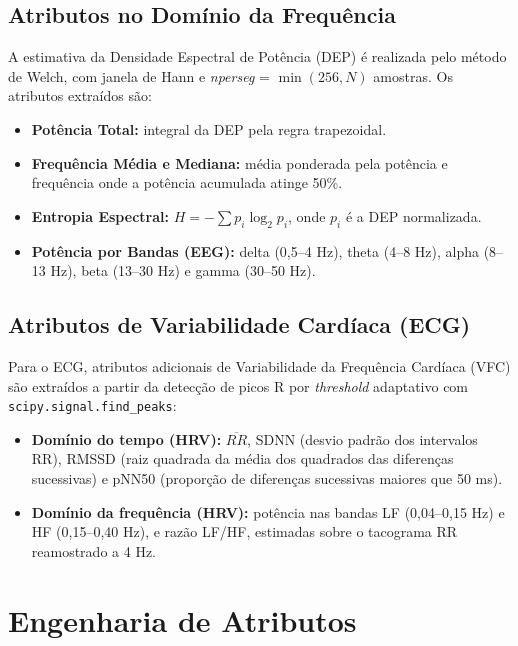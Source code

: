 \subsection{Atributos no Domínio da Frequência}

A estimativa da Densidade Espectral de Potência (DEP) é realizada pelo método de Welch, com janela de Hann e \textit{nperseg} = $\min(256, N)$ amostras. Os atributos extraídos são:

\begin{itemize}
    \item \textbf{Potência Total:} integral da DEP pela regra trapezoidal.
    \item \textbf{Frequência Média e Mediana:} média ponderada pela potência e frequência onde a potência acumulada atinge 50\%.
    \item \textbf{Entropia Espectral:} $H = -\sum p_i \log_2 p_i$, onde $p_i$ é a DEP normalizada.
    \item \textbf{Potência por Bandas (EEG):} delta (0,5--4 Hz), theta (4--8 Hz), alpha (8--13 Hz), beta (13--30 Hz) e gamma (30--50 Hz).
\end{itemize}

\subsection{Atributos de Variabilidade Cardíaca (ECG)}

Para o ECG, atributos adicionais de Variabilidade da Frequência Cardíaca (VFC) são extraídos a partir da detecção de picos R por \textit{threshold} adaptativo com \texttt{scipy.signal.find\_peaks}:

\begin{itemize}
    \item \textbf{Domínio do tempo (HRV):} $\overline{RR}$, SDNN (desvio padrão dos intervalos RR), RMSSD (raiz quadrada da média dos quadrados das diferenças sucessivas) e pNN50 (proporção de diferenças sucessivas maiores que 50 ms).
    \item \textbf{Domínio da frequência (HRV):} potência nas bandas LF (0,04--0,15 Hz) e HF (0,15--0,40 Hz), e razão LF/HF, estimadas sobre o tacograma RR reamostrado a 4 Hz.
\end{itemize}

\section{Engenharia de Atributos}
\label{sec:metodo_engenharia}

